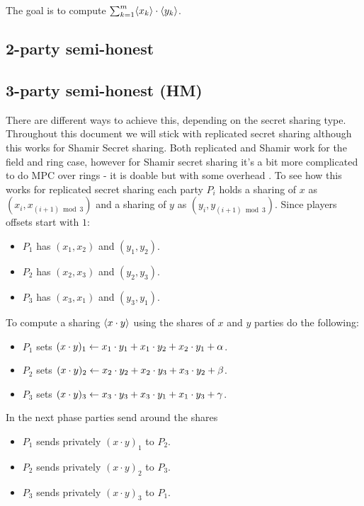 \documentclass[11pt]{article}
\begin{document}
The goal is to compute $\sum_{k=1}^m \langle {x_k} \rangle \cdot \langle {y_k} \rangle$.

\subsection{2-party semi-honest}
\subsection{3-party semi-honest (HM)}
There are different ways to achieve this, depending on the secret sharing
type. Throughout this document we will stick with replicated secret sharing
although this works for Shamir Secret sharing. Both replicated and Shamir
work for the field and ring case, however for Shamir secret sharing it's a
bit more complicated to do MPC over rings - it is doable but with some
overhead \cite{EPRINT:CraRamXin19, TCC:ACDEY19}. To see how this works for
replicated secret sharing each party $P_i$ holds a sharing of $x$ as $(x_i,
x_{(i+1) \bmod 3})$ and a sharing of $y$ as $(y_i, y_{ (i+1) \bmod 3})$.
Since players offsets start with $1$:

\begin{itemize}
    \item $P_1$ has $(x_1, x_2)$ and $(y_1, y_2)$.
    \item $P_2$ has $(x_2, x_3)$ and $(y_2, y_3)$.
    \item $P_3$ has $(x_3, x_1)$ and $(y_3, y_1)$.
\end{itemize}

\noindent
To compute a sharing $\langle {x \cdot y} \rangle$ using the shares of $x$ and $y$ parties do the following:

\begin{itemize}
    \item $P_1$ sets $(x \cdot y)_{1} \gets x_1 \cdot y_1 + x_1 \cdot y_2 + x_2 \cdot
    y_1 + \alpha$.
    \item $P_2$ sets $(x \cdot y)_2 \gets x_2 \cdot y_2 + x_2 \cdot y_3 + x_3
    \cdot y_2 + \beta$.
    \item $P_3$ sets $(x \cdot y)_3 \gets x_3 \cdot y_3 + x_3 \cdot y_1 + x_1 \cdot y_3 +
    \gamma$.
\end{itemize}

\noindent In the next phase parties send around the shares
\begin{itemize}
    \item $P_1$ sends privately $(x \cdot y)_1$ to $P_2$.
    \item $P_2$ sends privately $(x \cdot y)_2$ to $P_3$.
    \item $P_3$ sends privately $(x \cdot y)_3$ to $P_1$.
\end{itemize}
\end{document}
